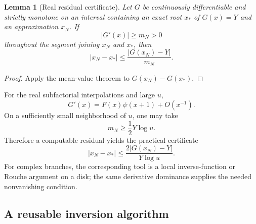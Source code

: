 \documentclass[11pt]{article}
\numberwithin{equation}{section}
\theoremstyle{mainthm}
\newtheorem{lemma}[theorem]{Lemma}
\theoremstyle{defstyle}
\theoremstyle{remark}
\newcommand{\abs}[1]{\left|#1\right|}
\begin{document}
\begin{lemma}[Real residual certificate]\label{lem:residual-certificate}
Let \(G\) be continuously differentiable and strictly monotone on an interval containing an exact root \(x_*\) of \(G(x)=Y\) and an approximation \(x_N\).  If
\begin{equation}\label{eq:derivative-lower-bound}
 \abs{G'(x)}\ge m_N>0
\end{equation}
throughout the segment joining \(x_N\) and \(x_*\), then
\begin{equation}\label{eq:residual-error-bound}
 \abs{x_N-x_*}
 \le\frac{\abs{G(x_N)-Y}}{m_N}.
\end{equation}
\end{lemma}

\begin{proof}
Apply the mean-value theorem to \(G(x_N)-G(x_*)\).
\end{proof}

For the real subfactorial interpolations and large \(u\),
\[
 G'(x)=F(x)\psi(x+1)+O(x^{-1}).
\]
On a sufficiently small neighborhood of \(u\), one may take
\begin{equation}\label{eq:subfactorial-m-lower}
 m_N\ge\frac12Y\log u.
\end{equation}
Therefore a computable residual yields the practical certificate
\begin{equation}\label{eq:subfactorial-residual-certificate}
 \abs{x_N-x_*}
 \le\frac{2\abs{G(x_N)-Y}}{Y\log u}.
\end{equation}
For complex branches, the corresponding tool is a local inverse-function or Rouche argument on a disk; the same derivative dominance supplies the needed nonvanishing condition.

\subsection{A reusable inversion algorithm}
\end{document}
